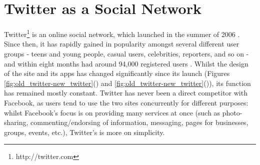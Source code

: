 \section{Twitter as a Social Network}
Twitter\footnote{http://twitter.com} is an online social network, which launched in the summer of 2006 \cite{krishnamurthy08}. Since then, it has rapidly gained in popularity amongst several different user groups - teens and young people, casual users, celebrities, reporters, and so on - and within eight months had around 94,000 registered users \cite{java07}. Whilst the design of the site and its apps has changed significantly since its launch (Figures \ref{fig:old_twitter-new_twitter}() and \ref{fig:old_twitter-new_twitter}()), its function has remained mostly constant. Twitter has never been a direct competitor with Facebook, as users tend to use the two sites concurrently for different purposes: whilst Facebook's focus is on providing many services at once (such as photo-sharing, commenting/endorsing of information, messaging, pages for businesses, groups, events, etc.), Twitter's is more on simplicity.

